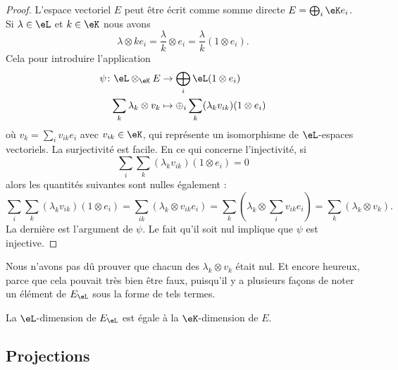 \begin{proof}
	L'espace vectoriel \( E\) peut être écrit comme somme directe \( E=\bigoplus_i\eK e_i\). Si \( \lambda\in \eL\) et \( k\in \eK\) nous avons
	\begin{equation}
		\lambda\otimes ke_i=\frac{ \lambda }{ k }\otimes e_i=\frac{ \lambda }{ k }(1\otimes e_i).
	\end{equation}
	Cela pour introduire l'application
	\begin{equation}
		\begin{aligned}
			\psi\colon \eL\otimes_{\eK}E & \to \bigoplus_i\eL(1\otimes e_i)                        \\
			\sum_k \lambda_k\otimes v_k  & \mapsto \oplus_i \sum_k(\lambda_k v_{ik})(1\otimes e_i)
		\end{aligned}
	\end{equation}
	où \( v_k=\sum_i v_{ik}e_i\) avec \( v_{ik}\in \eK\), qui représente un isomorphisme de \( \eL\)-espaces vectoriels. La surjectivité est facile. En ce qui concerne l'injectivité, si
	\begin{equation}
		\sum_i\sum_k(\lambda_kv_{ik})(1\otimes e_i)=0
	\end{equation}
	alors les quantités suivantes sont nulles également :
	\begin{equation}
		\sum_i\sum_k(\lambda_kv_{ik})(1\otimes e_i)=\sum_{ik}(\lambda_k\otimes v_{ik}e_i)=\sum_k(\lambda_k\otimes \sum_iv_{ik}e_i)=\sum_k(\lambda_k\otimes v_k).
	\end{equation}
	La dernière est l'argument de \( \psi\). Le fait qu'il soit nul implique que \( \psi\) est injective.
\end{proof}

\begin{remark}
	Nous n'avons pas dû prouver que chacun des \( \lambda_k\otimes v_k\) était nul. Et encore heureux, parce que cela pouvait très bien être faux, puisqu'il y a plusieurs façons de noter un élément de \( E_{\eL}\) sous la forme de tels termes.
\end{remark}

\begin{corollary}       \label{CORooTQGHooIKhNtr}
	La \( \eL\)-dimension de \( E_{\eL}\) est égale à la \( \eK\)-dimension de \( E\).
\end{corollary}

\subsection{Projections}

